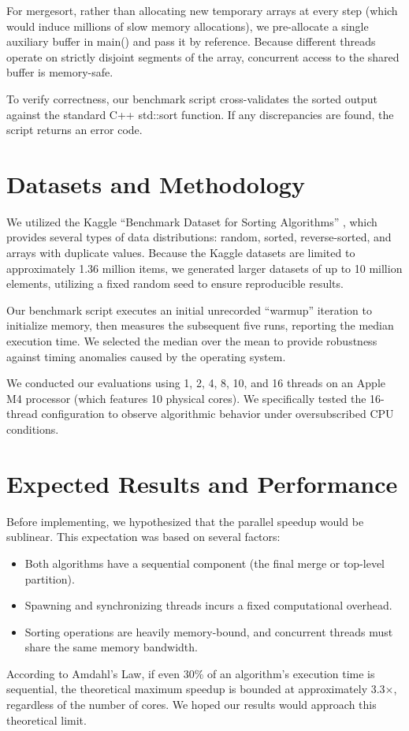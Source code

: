 \documentclass[letterpaper]{article}
\begin{document}
For mergesort, rather than allocating new temporary arrays at every step (which would induce millions of slow memory allocations), we pre-allocate a single auxiliary buffer in main() and pass it by reference. Because different threads operate on strictly disjoint segments of the array, concurrent access to the shared buffer is memory-safe.

To verify correctness, our benchmark script cross-validates the sorted output against the standard C++ std::sort function. If any discrepancies are found, the script returns an error code.

\section{Datasets and Methodology}
We utilized the Kaggle ``Benchmark Dataset for Sorting Algorithms'' \cite{kagglebench}, which provides several types of data distributions: random, sorted, reverse-sorted, and arrays with duplicate values. Because the Kaggle datasets are limited to approximately 1.36 million items, we generated larger datasets of up to 10 million elements, utilizing a fixed random seed to ensure reproducible results.

Our benchmark script executes an initial unrecorded ``warmup'' iteration to initialize memory, then measures the subsequent five runs, reporting the median execution time. We selected the median over the mean to provide robustness against timing anomalies caused by the operating system.

We conducted our evaluations using 1, 2, 4, 8, 10, and 16 threads on an Apple M4 processor (which features 10 physical cores). We specifically tested the 16-thread configuration to observe algorithmic behavior under oversubscribed CPU conditions.

\section{Expected Results and Performance}
Before implementing, we hypothesized that the parallel speedup would be sublinear. This expectation was based on several factors:
\begin{itemize}
    \item Both algorithms have a sequential component (the final merge or top-level partition).
    \item Spawning and synchronizing threads incurs a fixed computational overhead.
    \item Sorting operations are heavily memory-bound, and concurrent threads must share the same memory bandwidth.
\end{itemize}
According to Amdahl's Law, if even 30\% of an algorithm's execution time is sequential, the theoretical maximum speedup is bounded at approximately 3.3$\times$, regardless of the number of cores. We hoped our results would approach this theoretical limit.
\end{document}
